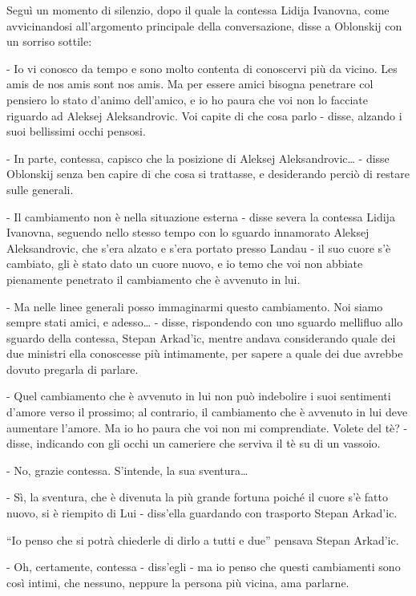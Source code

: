 Seguì un momento di silenzio, dopo il quale la contessa Lidija Ivanovna, come avvicinandosi all'argomento principale della conversazione, disse a Oblonskij con un sorriso sottile: 

- Io vi conosco da tempo e sono molto contenta di conoscervi più da vicino. Les amis de nos amis sont nos amis. Ma per essere amici bisogna penetrare col pensiero lo stato d'animo dell'amico, e io ho paura che voi non lo facciate riguardo ad Aleksej Aleksandrovic. Voi capite di che cosa parlo - disse, alzando i suoi bellissimi occhi pensosi. 

- In parte, contessa, capisco che la posizione di Aleksej Aleksandrovic\ldots{} - disse Oblonskij senza ben capire di che cosa si trattasse, e desiderando perciò di restare sulle generali. 

- Il cambiamento non è nella situazione esterna - disse severa la contessa Lidija Ivanovna, seguendo nello stesso tempo con lo sguardo innamorato Aleksej Aleksandrovic, che s'era alzato e s'era portato presso Landau - il suo cuore s'è cambiato, gli è stato dato un cuore nuovo, e io temo che voi non abbiate pienamente penetrato il cambiamento che è avvenuto in lui. 

- Ma nelle linee generali posso immaginarmi questo cambiamento. Noi siamo sempre stati amici, e adesso\ldots{} - disse, rispondendo con uno sguardo mellifluo allo sguardo della contessa, Stepan Arkad'ic, mentre andava considerando quale dei due ministri ella conoscesse più intimamente, per sapere a quale dei due avrebbe dovuto pregarla di parlare. 

- Quel cambiamento che è avvenuto in lui non può indebolire i suoi sentimenti d'amore verso il prossimo; al contrario, il cambiamento che è avvenuto in lui deve aumentare l'amore. Ma io ho paura che voi non mi comprendiate. Volete del tè? - disse, indicando con gli occhi un cameriere che serviva il tè su di un vassoio. 

- No, grazie contessa. S'intende, la sua sventura\ldots{} 

- Sì, la sventura, che è divenuta la più grande fortuna poiché il cuore s'è fatto nuovo, si è riempito di Lui - diss'ella guardando con trasporto Stepan Arkad'ic. 

``Io penso che si potrà chiederle di dirlo a tutti e due'' pensava Stepan Arkad'ic. 

- Oh, certamente, contessa - diss'egli - ma io penso che questi cambiamenti sono così intimi, che nessuno, neppure la persona più vicina, ama parlarne. 


